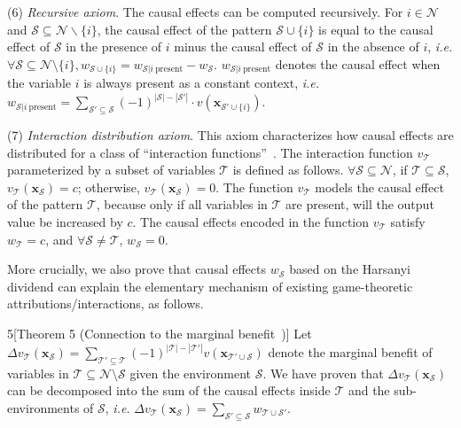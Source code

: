 (6) \textit{Recursive axiom}. The causal effects can be computed recursively.
For {\small $i\in \mathcal{N}$} and {\small $\mathcal{S}\subseteq \mathcal{N}\backslash\{i\}$}, the causal effect of the pattern {\small $\mathcal{S}\cup\{i\}$} is equal to the causal effect of {\small $\mathcal{S}$} in the presence of $i$ minus the causal effect of $\mathcal{S}$ in the absence of $i$, \emph{i.e.} {\small $\forall \mathcal{S}\!\subseteq\! \mathcal{N}\!\setminus\!\{i\}, w_{\mathcal{S}\cup\{i\}} = w_{\mathcal{S}|i~\text{present}} - w_{\mathcal{S}}$}. {\small $w_{\mathcal{S}|i~\text{present}}$} denotes the causal effect when the variable $i$ is always present as a constant context, \emph{i.e.} {\small $
w_{\mathcal{S}|i~\text{present}}=\sum_{\mathcal{S}'\subseteq \mathcal{S}} (-1)^{|\mathcal{S}|-|\mathcal{S}'|}\cdot v(\boldsymbol{x}_{\mathcal{S}'\cup\{i\}})$}.

(7) \textit{Interaction distribution axiom}. This axiom characterizes how causal effects are distributed for a class of ``interaction functions''~\cite{sundararajan2020shapley}.
The interaction function {\small $v_{\mathcal{T}}$} parameterized by a subset of variables {\small $\mathcal{T}$} is defined as follows.
{\small $\forall \mathcal{S}\subseteq \mathcal{N}$}, if {\small $\mathcal{T}\subseteq \mathcal{S}$}, {\small$v_{\mathcal{T}}(\boldsymbol{x}_{\mathcal{S}})=c$}; otherwise, {\small $v_{\mathcal{T}}(\boldsymbol{x}_{\mathcal{S}})=0$}.
The function {\small$v_{\mathcal{T}}$} models the causal effect of the pattern {\small$\mathcal{T}$}, because only if all variables in {\small$\mathcal{T}$} are present, will the output value be increased by {\small$c$}.
The causal effects encoded in the function {\small$v_{\mathcal{T}}$} satisfy {\small $w_{\mathcal{T}}=c$}, and {\small $\forall \mathcal{S}\neq \mathcal{T}$}, {\small $w_{\mathcal{S}}=0$}.

More crucially, we  also prove that causal effects {\small$w_{\mathcal{S}}$} based on the Harsanyi dividend can explain the elementary mechanism of existing game-theoretic attributions/interactions, as follows.


\begin{manualtheorem}{5}[Theorem 5 {\normalfont (Connection to the marginal benefit~\cite{grabisch1999axiomatic})}]\label{th:harsanyi-marginal-benefit}
Let {\small $\Delta v_{\mathcal{T}}(\boldsymbol{x}_{\mathcal{S}})=\sum_{\mathcal{T}'\subseteq \mathcal{T}}(-1)^{|\mathcal{T}|-|\mathcal{T}'|}v(\boldsymbol{x}_{\mathcal{T}'\cup \mathcal{S}})$} denote the marginal benefit of variables in {\small $\mathcal{T}\subseteq \mathcal{N}\setminus \mathcal{S}$} given the environment {\small $\mathcal{S}$}. We have proven that {\small $\Delta v_{\mathcal{T}}(\boldsymbol{x}_{\mathcal{S}})$} can be decomposed into the sum of the causal effects inside {\small $\mathcal{T}$} and the sub-environments of {\small $\mathcal{S}$}, \emph{i.e.} {\small $\Delta v_{\mathcal{T}}(\boldsymbol{x}_{\mathcal{S}})=\sum_{\mathcal{S}'\subseteq \mathcal{S}}w_{\mathcal{T}\cup \mathcal{S}'}$}.
\end{manualtheorem}


